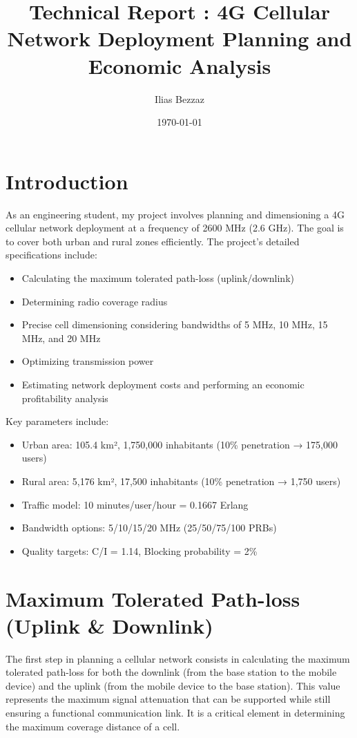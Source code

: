 \documentclass[a4paper,12pt]{article}
\title{Technical Report : 4G Cellular Network Deployment Planning and Economic Analysis}
\author{Ilias Bezzaz}
\date{\today}
\begin{document}
\maketitle

\section{Introduction}

As an engineering student, my project involves planning and dimensioning a 4G cellular network deployment at a frequency of 2600 MHz (2.6 GHz). The goal is to cover both urban and rural zones efficiently. 
The project's detailed specifications include:

\begin{itemize}
    \item Calculating the maximum tolerated path-loss (uplink/downlink)
    \item Determining radio coverage radius
    \item Precise cell dimensioning considering bandwidths of 5 MHz, 10 MHz, 15 MHz, and 20 MHz
    \item Optimizing transmission power
    \item Estimating network deployment costs and performing an economic profitability analysis
\end{itemize}

Key parameters include:

\begin{itemize}
    \item Urban area: 105.4 km², 1,750,000 inhabitants (10\% penetration → 175,000 users)
    \item Rural area: 5,176 km², 17,500 inhabitants (10\% penetration → 1,750 users)
    \item Traffic model: 10 minutes/user/hour = 0.1667 Erlang
    \item Bandwidth options: 5/10/15/20 MHz (25/50/75/100 PRBs)
    \item Quality targets: C/I = 1.14, Blocking probability = 2\%
\end{itemize}


\section{Maximum Tolerated Path-loss (Uplink \& Downlink)}

The first step in planning a cellular network consists in calculating the maximum tolerated path-loss for both the downlink (from the base station to the mobile device) and the uplink (from the mobile device to the base station). This value represents the maximum signal attenuation that can be supported while still ensuring a functional communication link. It is a critical element in determining the maximum coverage distance of a cell.
\end{document}
